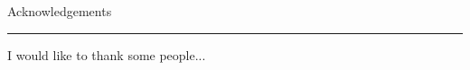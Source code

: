 \pagestyle{plain}


{\Large Acknowledgements}
\vskip 5mm
\hrule
\vskip 5mm
I would like to thank some people...
